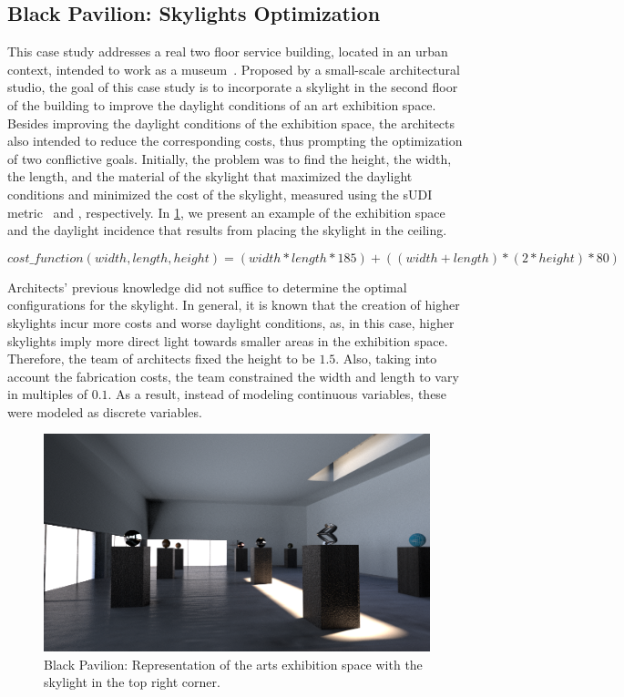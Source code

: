 \subsection{Black Pavilion: Skylights Optimization}
This case study addresses a real two floor service building, located in an urban context, intended to work as a museum~\cite{Caetano2018,IP2019MOO}. Proposed by a small-scale architectural studio, the goal of this case study is to incorporate a skylight in the second floor of the building to improve the daylight conditions of an art exhibition space. Besides improving the daylight conditions of the exhibition space, the architects also intended to reduce the corresponding costs, thus prompting the optimization of two conflictive goals. Initially, the problem was to find the height, the width, the length, and the material of the skylight that maximized the daylight conditions and minimized the cost of the skylight, measured using the \ac{sUDI} metric~\cite{Nabil2006} and , respectively. In \cref{fig:blackpavilion}, we present an example of the exhibition space and the daylight incidence that results from placing the skylight in the ceiling.

\begin{equation} \label{eq:costanalysis}
cost\_function(width, length, height) = (width * length * 185) + ((width + length) * ( 2 * height) * 80)
\end{equation}

Architects' previous knowledge did not suffice to determine the optimal configurations for the skylight. In general, it is known that the creation of higher skylights incur more costs and worse daylight conditions, as, in this case, higher skylights imply more direct light towards smaller areas in the exhibition space. Therefore, the team of architects fixed the height to be $1.5$\metre. Also, taking into account the fabrication costs, the team constrained the width and length to vary in multiples of $0.1$\metre. As a result, instead of modeling continuous variables, these were modeled as discrete variables.

\begin{figure}[htbp]
	\centering
	\includegraphics[width=\textwidth]{Images/Evaluation/BlackPavilion/PavPretoExample116x7204.png}
	\caption[Black Pavilion: Representation of the arts exhibition space with a skylight]{Black Pavilion: Representation of the arts exhibition space with the skylight in the top right corner.}
	\label{fig:blackpavilion}
\end{figure}

